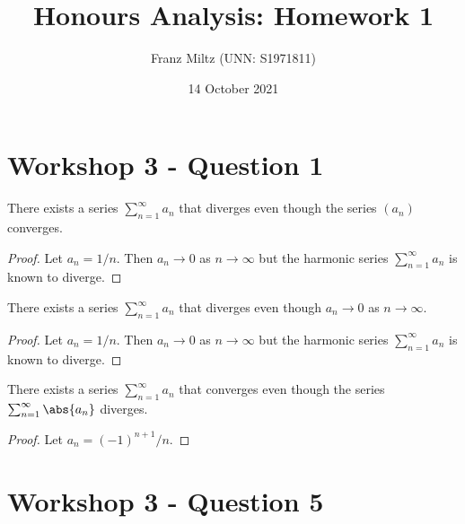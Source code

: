 \documentclass{article}
\begin{document}
\title{Honours Analysis: Homework 1}
\author{Franz Miltz (UNN: S1971811)}
\date{14 October 2021}
\maketitle

\section{Workshop 3 - Question 1}

\begin{claim}
   There exists a series $\sum_{n=1}^\infty a_n$ that diverges even though the 
   series $(a_n)$ converges.
\end{claim}
\begin{proof}
   Let $a_n=1/n$. Then $a_n\to 0$ as $n\to\infty$ but the harmonic series 
   $\sum_{n=1}^\infty a_n$ is known to diverge.
\end{proof}

\begin{claim}
   There exists a series $\sum_{n=1}^\infty a_n$ that diverges even though
   $a_n\to 0$ as $n\to\infty$.
\end{claim}
\begin{proof}
   Let $a_n=1/n$. Then $a_n\to 0$ as $n\to\infty$ but the harmonic series 
   $\sum_{n=1}^\infty a_n$ is known to diverge.
\end{proof}

\begin{claim}
   There exists a series $\sum_{n=1}^\infty a_n$ that converges even though
   the series $\sum_{n=1}^\infty \abs{a_n}$ diverges.
\end{claim}
\begin{proof}
   Let $a_n=(-1)^{n+1}/n$. 
\end{proof}

\section{Workshop 3 - Question 5}
\end{document}
